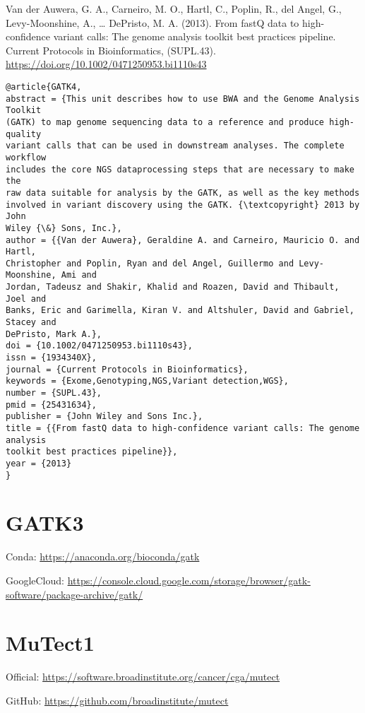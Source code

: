 \documentclass[]{article}
\begin{document}
Van der Auwera, G. A., Carneiro, M. O., Hartl, C., Poplin, R., del Angel, G., Levy-Moonshine, A., … DePristo, M. A. (2013). From fastQ data to high-confidence variant calls: The genome analysis toolkit best practices pipeline. Current Protocols in Bioinformatics, (SUPL.43). \url{https://doi.org/10.1002/0471250953.bi1110s43}

\begin{verbatim}
@article{GATK4,
abstract = {This unit describes how to use BWA and the Genome Analysis Toolkit
(GATK) to map genome sequencing data to a reference and produce high-quality
variant calls that can be used in downstream analyses. The complete workflow
includes the core NGS dataprocessing steps that are necessary to make the
raw data suitable for analysis by the GATK, as well as the key methods
involved in variant discovery using the GATK. {\textcopyright} 2013 by John
Wiley {\&} Sons, Inc.},
author = {{Van der Auwera}, Geraldine A. and Carneiro, Mauricio O. and Hartl,
Christopher and Poplin, Ryan and del Angel, Guillermo and Levy-Moonshine, Ami and
Jordan, Tadeusz and Shakir, Khalid and Roazen, David and Thibault, Joel and
Banks, Eric and Garimella, Kiran V. and Altshuler, David and Gabriel, Stacey and
DePristo, Mark A.},
doi = {10.1002/0471250953.bi1110s43},
issn = {1934340X},
journal = {Current Protocols in Bioinformatics},
keywords = {Exome,Genotyping,NGS,Variant detection,WGS},
number = {SUPL.43},
pmid = {25431634},
publisher = {John Wiley and Sons Inc.},
title = {{From fastQ data to high-confidence variant calls: The genome analysis
toolkit best practices pipeline}},
year = {2013}
}
\end{verbatim}

\section{GATK3}

Conda: \url{https://anaconda.org/bioconda/gatk}

GoogleCloud: \url{https://console.cloud.google.com/storage/browser/gatk-software/package-archive/gatk/}

\section{MuTect1}

Official: \url{https://software.broadinstitute.org/cancer/cga/mutect}

GitHub: \url{https://github.com/broadinstitute/mutect}
\end{document}
